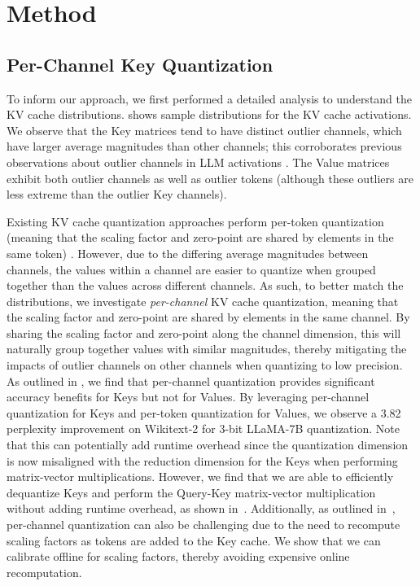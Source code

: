 \section{Method}
\label{sec:method}

\subsection{Per-Channel Key Quantization}
\label{sec:method-perchannel}
To inform our approach, we first performed a detailed analysis to understand the KV cache distributions.
 shows sample distributions for the KV cache activations. We observe that the Key matrices tend to have distinct outlier channels, which have larger average magnitudes than other channels; this corroborates previous observations about outlier channels in LLM activations \cite{dettmers2022llm,xiao2023smoothquant}. The Value matrices exhibit both outlier channels as well as outlier tokens (although these outliers are less extreme than the outlier Key channels).

Existing KV cache quantization approaches perform per-token quantization (meaning that the scaling factor and zero-point are shared by elements in the same token) \cite{sheng2023flexgen, zhao2023atom}. However, due to the differing average magnitudes between channels, the values within a channel are easier to quantize when grouped together than the values across different channels. As such, to better match the distributions, we investigate \textit{per-channel} KV cache quantization, meaning that the scaling factor and zero-point are shared by elements in the same channel. By sharing the scaling factor and zero-point along the channel dimension, this will naturally group together values with similar magnitudes, thereby mitigating the impacts of outlier channels on other channels when quantizing to low precision. As outlined in , we find that per-channel quantization provides significant accuracy benefits for Keys but not for Values. By leveraging per-channel quantization for Keys and per-token quantization for Values, we observe a 3.82 perplexity improvement on Wikitext-2 for 3-bit LLaMA-7B quantization. Note that this can potentially add runtime overhead since the quantization dimension is now misaligned with the reduction dimension for the Keys when performing matrix-vector multiplications. However, we find that we are able to efficiently dequantize Keys and perform the Query-Key matrix-vector multiplication without adding runtime overhead, as shown in~.
Additionally, as outlined in~, per-channel quantization can also be challenging due to the need to recompute scaling factors as tokens are added to the Key cache. We show that we can calibrate offline for scaling factors, thereby avoiding expensive online recomputation.

